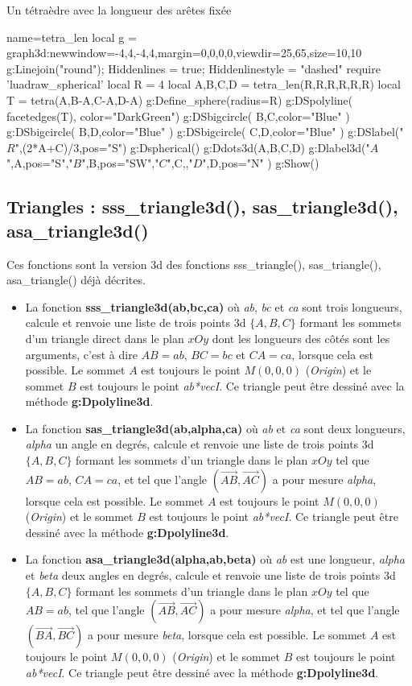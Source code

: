 \begin{demo}{Un tétraèdre avec la longueur des arêtes fixée}
\begin{luadraw}{name=tetra_len}
local g = graph3d:new{window={-4,4,-4,4},margin={0,0,0,0},viewdir={25,65},size={10,10}}
g:Linejoin("round"); Hiddenlines = true; Hiddenlinestyle = "dashed"
require 'luadraw_spherical'
local R = 4
local A,B,C,D = tetra_len(R,R,R,R,R,R)
local T = tetra(A,B-A,C-A,D-A)
g:Define_sphere({radius=R})
g:DSpolyline( facetedges(T), {color="DarkGreen"})
g:DSbigcircle( {B,C},{color="Blue"} )
g:DSbigcircle( {B,D},{color="Blue"} )
g:DSbigcircle( {C,D},{color="Blue"}  )
g:DSlabel("$R$",(2*A+C)/3,{pos="S"})
g:Dspherical()
g:Ddots3d({A,B,C,D})
g:Dlabel3d("$A$",A,{pos="S"},"$B$",B,{pos="SW"},"$C$",C,{},"$D$",D,{pos="N"} )
g:Show()
\end{luadraw}
\end{demo}

\subsection{Triangles : sss\_triangle3d(), sas\_triangle3d(), asa\_triangle3d()}

Ces fonctions sont la version 3d des fonctions  sss\_triangle(), sas\_triangle(), asa\_triangle() déjà décrites.
\begin{itemize}
    \item La fonction \textbf{sss\_triangle3d(ab,bc,ca)} où \emph{ab}, \emph{bc} et \emph{ca} sont trois longueurs, calcule et renvoie une liste de trois points 3d $\{A,B,C\}$ formant les sommets d'un triangle direct dans le plan $xOy$ dont les longueurs des côtés sont les arguments, c'est à dire $AB=ab$, $BC=bc$ et $CA=ca$, lorsque cela est possible. Le sommet $A$ est toujours le point $M(0,0,0)$ (\emph{Origin}) et le sommet $B$ est toujours le point \emph{ab*vecI}. Ce triangle peut être dessiné avec la méthode \textbf{g:Dpolyline3d}.
    \item La fonction \textbf{sas\_triangle3d(ab,alpha,ca)} où \emph{ab} et \emph{ca} sont deux longueurs, \emph{alpha} un angle en degrés, calcule et renvoie une liste de trois points 3d $\{A,B,C\}$ formant les sommets d'un triangle dans le plan $xOy$ tel que $AB=ab$, $CA=ca$, et tel que l'angle $(\vec{AB},\vec{AC})$ a pour mesure \emph{alpha}, lorsque cela est possible. Le sommet $A$ est toujours le point $M(0,0,0)$ (\emph{Origin}) et le sommet $B$ est toujours le point \emph{ab*vecI}. Ce triangle peut être dessiné avec la méthode \textbf{g:Dpolyline3d}.
    \item La fonction \textbf{asa\_triangle3d(alpha,ab,beta)} où \emph{ab} est une longueur, \emph{alpha} et \emph{beta} deux angles en degrés, calcule et renvoie une liste de trois points 3d $\{A,B,C\}$ formant les sommets d'un triangle dans le plan $xOy$ tel que $AB=ab$, tel que l'angle $(\vec{AB},\vec{AC})$ a pour mesure \emph{alpha}, et tel que l'angle $(\vec{BA},\vec{BC})$ a pour mesure \emph{beta}, lorsque cela est possible. Le sommet $A$ est toujours le point $M(0,0,0)$ (\emph{Origin}) et le sommet $B$ est toujours le point \emph{ab*vecI}. Ce triangle peut être dessiné avec la méthode \textbf{g:Dpolyline3d}.
\end{itemize}

